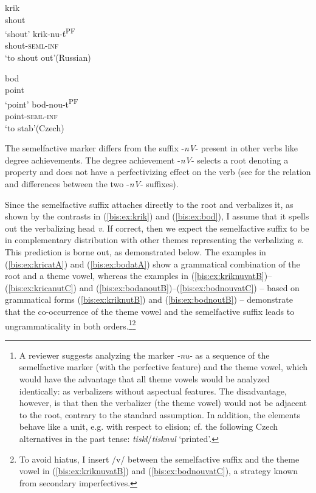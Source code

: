 \documentclass[output=paper]{langscibook}
\begin{document}
\ea\label{bis:ex:krik}
\ea\label{bis:ex:krikA} \gll 
krik \\ 
shout \\
\glt ‘shout’
\ex\label{bis:ex:kriknutB} \gll krik-nu-ť\textsuperscript{PF} \\  
shout-\textsc{seml}-\textsc{inf} \\
\glt ‘to shout out’\hfill (Russian)
\z

\ex\label{bis:ex:bod}
\ea\label{bis:ex:bodA} \gll 
bod \\ 
point \\
\glt ‘point’
\ex\label{bis:ex:bodnoutB} \gll bod-nou-t\textsuperscript{PF} \\  
point-\textsc{seml}-\textsc{inf} \\
\glt ‘to stab’\hfill (Czech)
\z\z

\noindent The semelfactive marker differs from the suffix -\textit{nV}- present in other verbs like degree achievements. The degree achievement -\textit{nV}- selects a root denoting a property and does not have a perfectivizing effect on the verb (see \citealt{TaraldsenMedova.Wiland2019} for the relation and differences between the two -\textit{nV}- suffixes).

Since the semelfactive suffix attaches directly to the root and verbalizes it, as shown by the contrasts in (\ref{bis:ex:krik}) and (\ref{bis:ex:bod}), I assume that it spells out the verbalizing head \textit{v}. If correct, then we expect the semelfactive suffix to be in complementary distribution with other themes representing the verbalizing \textit{v}. This prediction is borne out, as demonstrated below. The  examples in (\ref{bis:ex:kricatA}) and (\ref{bis:ex:bodatA}) show a grammatical combination of the root and a theme vowel, whereas the examples in (\ref{bis:ex:kriknuvatB})--(\ref{bis:ex:kricanutC}) and (\ref{bis:ex:bodanoutB})--(\ref{bis:ex:bodnouvatC}) -- based on grammatical forms (\ref{bis:ex:kriknutB}) and (\ref{bis:ex:bodnoutB}) – demonstrate that the co-occurrence of the theme vowel and the semelfactive suffix leads to ungrammaticality in both orders.\footnote{A reviewer suggests analyzing the marker \textit{-nu-} as a sequence of the semelfactive marker (with the perfective feature) and the theme vowel, which would have the advantage that all theme vowels would be analyzed identically: as verbalizers without aspectual features. The disadvantage, however, is that then the verbalizer (the theme vowel) would not be adjacent to the root, contrary to the standard assumption. In addition, the elements behave like a unit, e.g. with respect to elision; cf. the following Czech alternatives in the past tense: \textit{tiskl}/\textit{tisknul} ‘printed’.}\footnote{To avoid hiatus, I insert /v/ between the semelfactive suffix and the theme vowel in (\ref{bis:ex:kriknuvatB}) and (\ref{bis:ex:bodnouvatC}), a strategy known from secondary imperfectives.} 
\end{document}
